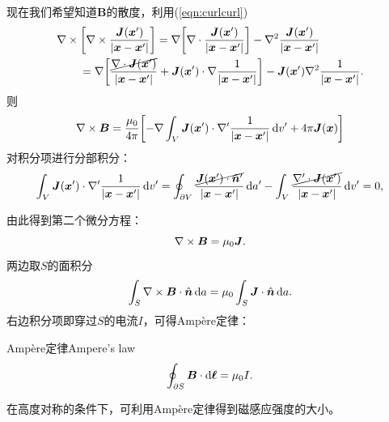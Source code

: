 现在我们希望知道$\bm B$的散度，利用(\ref{eqn:curlcurl})
\begin{align*}
    &\nabla\times\biggl[\nabla\times\frac{\bm J(\bm x')}{|\bm x-\bm x'|}\biggr]=\nabla\biggl[\nabla\cdot\frac{\bm J(\bm x')}{|\bm x-\bm x'|}\biggr]-\nabla^2\frac{\bm J(\bm x')}{|\bm x-\bm x'|}\\
    &\qquad=\nabla\biggl[\frac{\cancel{\nabla\cdot\bm J(\bm x')}}{|\bm x-\bm x'|}+\bm J(\bm x')\cdot\nabla\frac1{|\bm x-\bm x'|}\biggr]-\bm J(\bm x')\nabla^2\frac1{|\bm x-\bm x'|}.
\end{align*}
则
\[
    \nabla\times\bm B=\frac{\mu_0}{4\pi}\biggl[-\nabla\int_V\bm J(\bm x')\cdot\nabla'\frac1{|\bm x-\bm x'|}\mathop{}\!\mathrm{d} v'+4\pi\bm J(\bm x)\biggr]
\]
对积分项进行分部积分：
\[
    \int_V\bm J(\bm x')\cdot\nabla'\frac1{|\bm x-\bm x'|}\mathop{}\!\mathrm{d} v'=\oint_{\partial V}\frac{\cancel{\bm J(\bm x')\cdot\mathop{}\!\hat{\bm n}'}}{|\bm x-\bm x'|}\mathop{}\!\mathrm{d} a'-\int_V\frac{\cancel{\nabla'\cdot\bm J(\bm x')}}{|\bm x-\bm x'|}\mathop{}\!\mathrm{d} v'=0,
\]

由此得到第二个微分方程：
\begin{equation}
    \label{eqn:curlB}
    \nabla\times\bm B=\mu_0\bm J.
\end{equation}
两边取$S$的面积分
\[
    \int_S\nabla\times\bm B\cdot\mathop{}\!\hat{\bm n}\mathop{}\!\mathrm{d} a=\mu_0\int_S\bm J\cdot\mathop{}\!\hat{\bm n}\mathop{}\!\mathrm{d} a.
\]
右边积分项即穿过$S$的电流$I$，可得Ampère定律：
\begin{theorem}{Ampère定律}{Ampere's law}
    \begin{equation}
        \label{eqn:Ampere}
        \oint_{\partial S}\bm B\cdot\mathop{}\!\mathrm{d}\bm\ell=\mu_0I.
    \end{equation}
\end{theorem}
在高度对称的条件下，可利用Ampère定律得到磁感应强度的大小。
